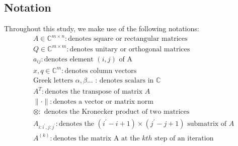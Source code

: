 \subsection{Notation}
Throughout this study, we make use of the following notations:
\begin{align*}\nonumber
	&A \in \mathbb{C}^{m\times n}: \text{denotes square or rectangular matrices}\\
	&Q \in \mathbb{C}^{m\times m}: \text{denotes unitary or orthogonal matrices}\\
	&a_{ij}: \text{denotes element $(i, j)$ of A}\\
	&x, q \in \mathbb{C}^{m}: \text{denotes column vectors}\\
	&\text{Greek letters }\alpha, \beta\text{...} \text{ : denotes scalars in $\mathbb{C}$}\\
	&A^{T}: \text{denotes the transpose of matrix $A$}\\
	&\| \cdot \|: \text{denotes a vector or matrix norm }\\
	& \otimes: \text{ denotes the Kronecker product of two matrices}\\
	&A_{i:i^\prime, j:j^\prime}: \text{denotes the $(i^\prime - i + 1) \times (j^\prime - j + 1)$ submatrix of $A$}\\
	&A^{(k)}: \text{denotes the matrix A at the $kth$ step of an iteration}
\end{align*}
